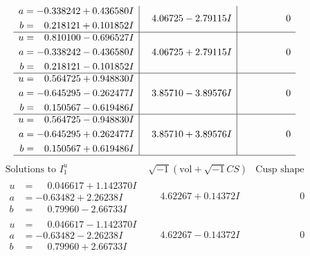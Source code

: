 \documentclass[1p]{elsarticle_modified}
\theoremstyle{definition}
\newcommand{\I}{\sqrt{-1}}
\begin{document}
$$\begin{array}{c|c|c}
\begin{aligned}
a &= -0.338242 + 0.436580 I \\
b &= \phantom{-}0.218121 + 0.101852 I\end{aligned}
 & \phantom{-}4.06725 - 2.79115 I & \phantom{-0.000000 } 0 \\ \hline\begin{aligned}
u &= \phantom{-}0.810100 - 0.696527 I \\
a &= -0.338242 - 0.436580 I \\
b &= \phantom{-}0.218121 - 0.101852 I\end{aligned}
 & \phantom{-}4.06725 + 2.79115 I & \phantom{-0.000000 } 0 \\ \hline\begin{aligned}
u &= \phantom{-}0.564725 + 0.948830 I \\
a &= -0.645295 - 0.262477 I \\
b &= \phantom{-}0.150567 - 0.619486 I\end{aligned}
 & \phantom{-}3.85710 - 3.89576 I & \phantom{-0.000000 } 0 \\ \hline\begin{aligned}
u &= \phantom{-}0.564725 - 0.948830 I \\
a &= -0.645295 + 0.262477 I \\
b &= \phantom{-}0.150567 + 0.619486 I\end{aligned}
 & \phantom{-}3.85710 + 3.89576 I & \phantom{-0.000000 } 0\\
 \hline 
 \end{array}$$\newpage$$\begin{array}{c|c|c}  
\text{Solutions to }I^u_{1}& \I (\text{vol} + \sqrt{-1}CS) & \text{Cusp shape}\\
 \hline 
\begin{aligned}
u &= \phantom{-}0.046617 + 1.142370 I \\
a &= -0.63482 + 2.26238 I \\
b &= \phantom{-}0.79960 - 2.66733 I\end{aligned}
 & \phantom{-}4.62267 + 0.14372 I & \phantom{-0.000000 } 0 \\ \hline\begin{aligned}
u &= \phantom{-}0.046617 - 1.142370 I \\
a &= -0.63482 - 2.26238 I \\
b &= \phantom{-}0.79960 + 2.66733 I\end{aligned}
 & \phantom{-}4.62267 - 0.14372 I & \phantom{-0.000000 } 0 \\ \hline\begin{aligned}

\end{aligned}
\end{array}$$
\end{document}
